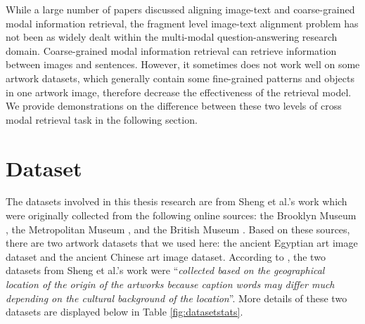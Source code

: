 While a large number of papers discussed aligning image-text and coarse-grained modal information retrieval, the fragment level image-text alignment problem has not been as widely dealt within the multi-modal question-answering research domain. Coarse-grained modal information retrieval can retrieve information between images and sentences. However, it sometimes does not work well on some artwork datasets, which generally contain some fine-grained patterns and objects in one artwork image, therefore decrease the effectiveness of the retrieval model. We provide demonstrations on the difference between these two levels of cross modal retrieval task in the following section.




\section{Dataset}

The datasets involved in this thesis research are from Sheng et al.'s work \cite{artworkcaption} which were originally collected from the following online sources: the Brooklyn Museum \cite{brooklynmuseum}, the Metropolitan Museum \cite{themet}, and the British Museum \cite{thebritishmuseum}. Based on these sources, there are two artwork datasets that we used here: the ancient Egyptian art image dataset and the ancient Chinese art image dataset. According to \cite{artworkcaption}, the two datasets from Sheng et al.'s work were ``\textit{collected based on the geographical location of the origin of the artworks because caption words may differ much depending on the cultural background of the location}''. More details of these two datasets are displayed below in Table \ref{fig:datasetstats}. 

